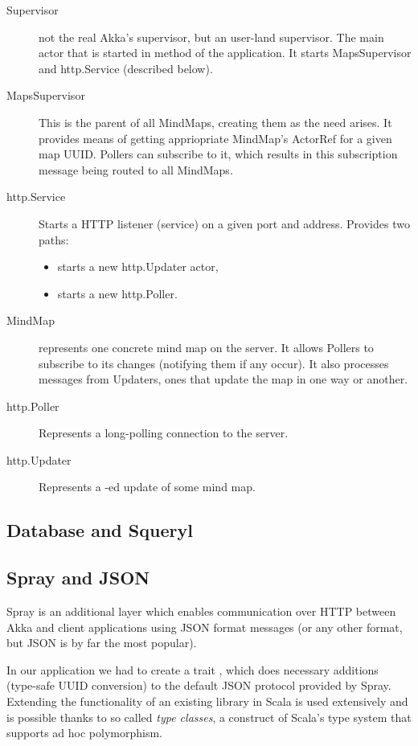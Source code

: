 \begin{description}
	\item[Supervisor] not the real Akka's supervisor, but an user-land supervisor. The main actor that is started in  method of the application. It starts MapsSupervisor and http.Service (described below).
	\item[MapsSupervisor] This is the parent of all MindMaps, creating them as the need arises. It provides means of getting appriopriate MindMap's ActorRef for a given map UUID. Pollers can subscribe to it, which results in this subscription message being routed to all MindMaps.
	\item[http.Service] Starts a HTTP listener (service) on a given port and address. Provides two paths: \begin{itemize}
		\item {} starts a new http.Updater actor,
		\item {} starts a new http.Poller.
	\end{itemize}
	\item[MindMap] represents one concrete mind map on the server. It allows Pollers to subscribe to its changes (notifying them if any occur). It also processes messages from Updaters, ones that update the map in one way or another.
	\item[http.Poller] Represents a long-polling connection to the server.
	\item[http.Updater] Represents a -ed update of some mind map.
\end{description}

\subsection{Database and Squeryl}
\label{subsection:akka-database}


\subsection{Spray and JSON}
\label{subsection:akka-spray}
Spray is an additional layer which enables communication over HTTP between Akka and client applications using JSON format messages (or any other format, but JSON is by far the most popular).

In our application we had to create a trait , which does necessary additions (type-safe UUID conversion) to the default JSON protocol provided by Spray. Extending the functionality of an existing library in Scala is used extensively and is possible thanks to so called \emph{type classes}, a construct of Scala's type system that supports ad hoc polymorphism.

